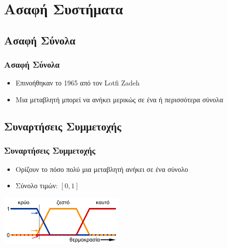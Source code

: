 \documentclass[xetex,serif,mathserif,14pt]{beamer}
\begin{document}
\section{Ασαφή Συστήματα}

\subsection{Ασαφή Σύνολα}

\begin{frame}
\frametitle{Ασαφή Σύνολα}
\begin{itemize}
  \item Επινοήθηκαν το 1965 από τον Lotfi Zadeh\pause
  \item Μια μεταβλητή μπορεί να ανήκει μερικώς σε ένα ή περισσότερα σύνολα
\end{itemize}
\end{frame}

%

\subsection{Συναρτήσεις Συμμετοχής}

\begin{frame}[t]
\frametitle{Συναρτήσεις Συμμετοχής}
\begin{itemize}
  \item Ορίζουν το πόσο πολύ μια μεταβλητή ανήκει σε ένα σύνολο\pause
  \item Σύνολο τιμών: $[0, 1]$\pause
\end{itemize}
\begin{center}
    \includegraphics[height=2.5cm]{images/temperatureMF.pdf}
\end{center}
\end{frame}
\end{document}
